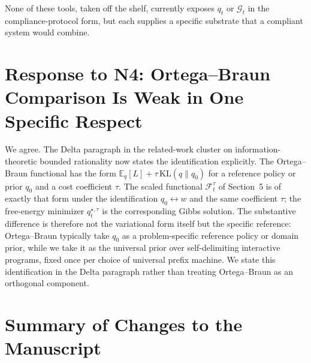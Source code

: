 \documentclass[11pt]{article}
\begin{document}
None of these tools, taken off the shelf, currently exposes $q_t$ or $\mathcal{G}_t$ in the compliance-protocol form, but each supplies a specific substrate that a compliant system would combine.

\section*{Response to N4: Ortega--Braun Comparison Is Weak in One Specific Respect}

We agree. The Delta paragraph in the related-work cluster on information-theoretic bounded rationality now states the identification explicitly. The Ortega--Braun functional has the form $\mathbb{E}_q[L] + \tau\,\mathrm{KL}(q\|q_0)$ for a reference policy or prior $q_0$ and a cost coefficient $\tau$. The scaled functional $\mathcal{F}_t^\tau$ of Section~5 is of exactly that form under the identification $q_0 \leftrightarrow w$ and the same coefficient $\tau$; the free-energy minimizer $q_t^{\star,\tau}$ is the corresponding Gibbs solution. The substantive difference is therefore not the variational form itself but the specific reference: Ortega--Braun typically take $q_0$ as a problem-specific reference policy or domain prior, while we take it as the universal prior over self-delimiting interactive programs, fixed once per choice of universal prefix machine. We state this identification in the Delta paragraph rather than treating Ortega--Braun as an orthogonal component.

\section*{Summary of Changes to the Manuscript}
\end{document}
